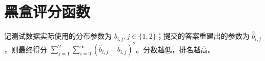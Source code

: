 \documentclass{article}
\begin{document}


\section{黑盒评分函数} %
\label{sec:黑盒评分函数}

记测试数据实际使用的分布参数为 $b_{i,j}, j\in \{1,2\}$；提交的答案重建出的参数为 $\hat{b}_{i,j}$，则最终得分 $\displaystyle\sum_{j=1}^{2}\sum_{i=0}^{\infty} \left( \hat{b}_{i,j} - b_{i,j} \right)^2$。分数越低，排名越高。
    
\end{document}
